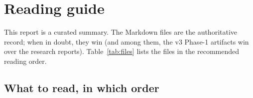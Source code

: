 \documentclass[11pt,a4paper]{article}
\begin{document}
\newpage
{\setcounter{tocdepth}{1}\tableofcontents}
\vspace{8pt}

\section{Reading guide}\label{sec:reading}
This report is a curated summary. The Markdown files are the authoritative record; when in doubt, they win (and among them, the v3 Phase-1 artifacts win over the research reports). Table~\ref{tab:files} lists the files in the recommended reading order.

\subsection{What to read, in which order}
\end{document}
